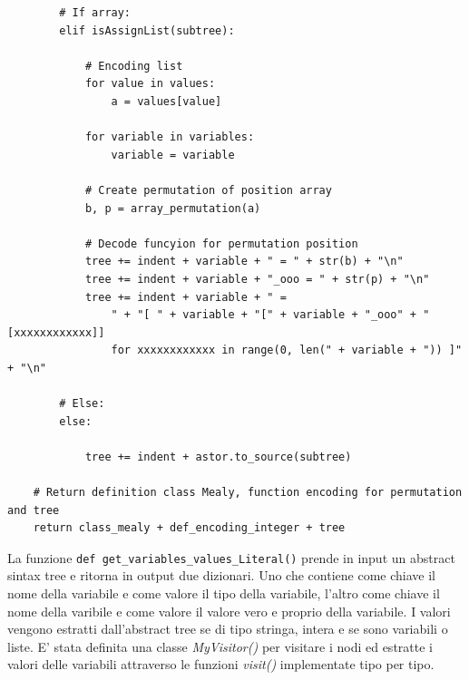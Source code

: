 \documentclass[a4paper,oneside,openright,titlepage,10pt,footinclude,headinclude]{scrbook}
\begin{document}
\begin{graybox}[innerleftmargin=2,]
\begin{lstlisting}
        # If array:
        elif isAssignList(subtree):

            # Encoding list
            for value in values:
                a = values[value]

            for variable in variables:
                variable = variable

            # Create permutation of position array
            b, p = array_permutation(a)

            # Decode funcyion for permutation position
            tree += indent + variable + " = " + str(b) + "\n"
            tree += indent + variable + "_ooo = " + str(p) + "\n"
            tree += indent + variable + " = 
                " + "[ " + variable + "[" + variable + "_ooo" + "[xxxxxxxxxxxx]] 
                for xxxxxxxxxxxx in range(0, len(" + variable + ")) ]" + "\n"

        # Else:
        else:

            tree += indent + astor.to_source(subtree)

    # Return definition class Mealy, function encoding for permutation and tree
    return class_mealy + def_encoding_integer + tree
\end{lstlisting}
\end{graybox}

La funzione \texttt{def get\_variables\_values\_Literal()} prende in input un abstract sintax tree e ritorna in output due dizionari. Uno che contiene come chiave il nome della variabile e come valore il tipo della variabile, l'altro come chiave il nome della varibile e come valore il valore vero e proprio della variabile. I valori vengono estratti dall'abstract tree se di tipo stringa, intera e se sono variabili o liste. E' stata definita una classe \textit{MyVisitor()} per visitare i nodi ed estratte i valori delle variabili attraverso le funzioni \textit{visit()} implementate tipo per tipo.
\end{document}
